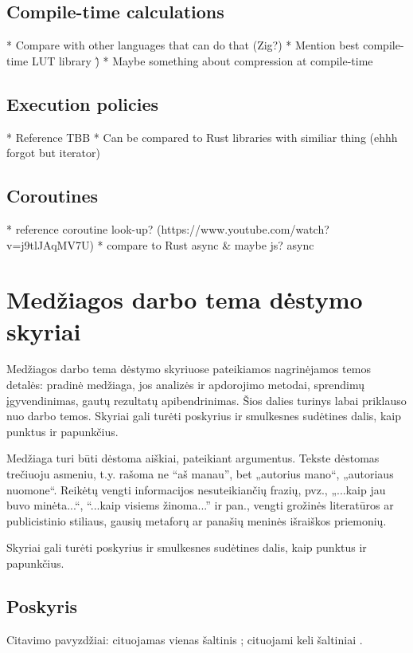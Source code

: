 \documentclass[
    english, %
]{VUMIFPSkursinis}
\begin{document}
\subsection{Compile-time calculations}
* Compare with other languages that can do that (Zig?)
* Mention best compile-time LUT library \:\^)
* Maybe something about compression at compile-time

\subsection{Execution policies}
* Reference TBB
* Can be compared to Rust libraries with similiar thing (ehhh forgot but iterator)

\subsection{Coroutines}
* reference coroutine look-up? (https://www.youtube.com/watch?v=j9tlJAqMV7U)
* compare to Rust async \& maybe js? async

\section{Medžiagos darbo tema dėstymo skyriai}
Medžiagos darbo tema dėstymo skyriuose pateikiamos nagrinėjamos temos detalės:
pradinė medžiaga, jos analizės ir apdorojimo metodai, sprendimų įgyvendinimas,
gautų rezultatų apibendrinimas. Šios dalies turinys labai priklauso nuo darbo
temos. Skyriai gali turėti poskyrius ir smulkesnes sudėtines dalis, kaip
punktus ir papunkčius.

Medžiaga turi būti dėstoma aiškiai, pateikiant argumentus. Tekste dėstomas
trečiuoju asmeniu, t.y. rašoma ne \enquote{aš manau}, bet „autorius mano“, „autoriaus
nuomone“. Reikėtų vengti informacijos nesuteikiančių frazių, pvz., „...kaip jau
buvo minėta...“, \enquote{...kaip visiems žinoma...} ir pan., vengti grožinės
literatūros ar publicistinio stiliaus, gausių metaforų ar panašių meninės
išraiškos priemonių.

Skyriai gali turėti poskyrius ir smulkesnes sudėtines dalis, kaip punktus ir
papunkčius.

\subsection{Poskyris}
Citavimo pavyzdžiai: cituojamas vienas šaltinis \cite{PvzStraipsnLt}; cituojami
keli šaltiniai \cite{PvzStraipsnEn, PvzStraipsnLta, PvzKonfLt, PvzKonfEn, PvzKnygLt, PvzKnygEn,
PvzElPubLt, PvzElPubEn, PvzBakLt, PvzMagistrLt, PvzPhdEn}.
\end{document}
